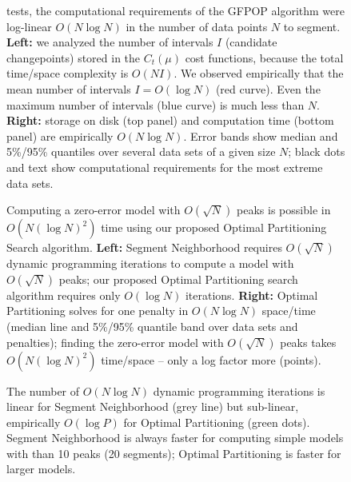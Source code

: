 \documentclass[article]{jss}
\begin{document}
\begin{figure}[t!]
{  tests, the computational requirements of the GFPOP algorithm
  were log-linear $O(N \log N)$ in the number of data points $N$ to
  segment. \textbf{Left:} we analyzed the number of intervals $I$
  (candidate changepoints) stored in the $C_t(\mu)$ cost functions,
  because the total time/space complexity is $O(NI)$. We observed
  empirically that the mean number of intervals $I=O(\log N)$ (red
  curve). Even the maximum number of intervals (blue curve) is much
  less than $N$. \textbf{Right:} storage on disk (top panel) and
  computation time (bottom panel) are empirically $O(N \log N)$. Error
  bands show median and 5\%/95\% quantiles over several data sets of a
  given size $N$; black dots and text show computational requirements
  for the most extreme data sets.}
\end{figure}

\begin{figure}[t!]
\centering
\begin{minipage}{3in}
  
\end{minipage} 
\begin{minipage}{3in} 
   
\end{minipage} 
\caption{\label{fig:evaluations} Computing a zero-error model with
  $O(\sqrt{N})$ peaks is possible in $O(N(\log N)^2)$ time using our
  proposed Optimal Partitioning Search algorithm. \textbf{Left:}
  Segment Neighborhood requires $O(\sqrt{N})$ dynamic programming
  iterations to compute a model with $O(\sqrt{N})$ peaks; our proposed
  Optimal Partitioning search algorithm requires only $O(\log N)$
  iterations. \textbf{Right:} Optimal Partitioning solves for one
  penalty in $O(N\log N)$ space/time (median line and 5\%/95\% quantile band
  over data sets and penalties); finding the zero-error model with
  $O(\sqrt{N})$ peaks takes $O(N (\log N)^2)$ time/space -- only a log
  factor more (points).}
\end{figure} 
  
\begin{figure}[t!]
\centering

\caption{\label{fig:variable-peaks} The number of $O(N \log N)$
  dynamic programming iterations is linear for Segment Neighborhood
  (grey line) but sub-linear, empirically $O(\log P)$ for Optimal
  Partitioning (green dots). Segment Neighborhood is always faster for
  computing simple models with than 10 peaks (20 segments); Optimal
  Partitioning is faster for larger models.}
\end{figure}
\end{document}
